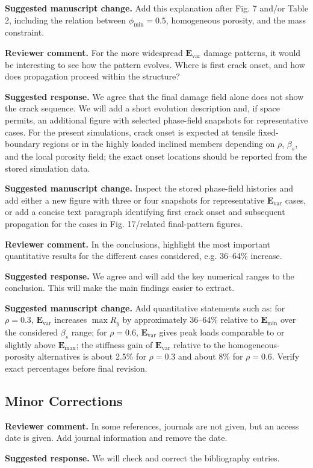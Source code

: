 \documentclass[11pt,a4paper]{article}
\newcommand{\Evar}{\ensuremath{\mathbf{E}_{\mathrm{var}}}}
\newcommand{\Emin}{\ensuremath{\mathbf{E}_{\mathrm{min}}}}
\newcommand{\Emax}{\ensuremath{\mathbf{E}_{\mathrm{max}}}}
\newcommand{\comment}[1]{\par\noindent\textbf{Reviewer comment.} #1\par}
\newcommand{\response}[1]{\par\noindent\textbf{Suggested response.} #1\par}
\newcommand{\change}[1]{\par\noindent\textbf{Suggested manuscript change.} #1\par}
\begin{document}
\change{Add this explanation after Fig. 7 and/or Table 2, including the
relation between \(\phi_\mathrm{min}=0.5\), homogeneous porosity, and the mass
constraint.}

\comment{For the more widespread \(\Evar\) damage patterns, it would be
interesting to see how the pattern evolves. Where is first crack onset, and how
does propagation proceed within the structure?}

\response{We agree that the final damage field alone does not show the crack
sequence. We will add a short evolution description and, if space permits, an
additional figure with selected phase-field snapshots for representative cases.
For the present simulations, crack onset is expected at tensile fixed-boundary
regions or in the highly loaded inclined members depending on \(\rho\),
\(\beta_s\), and the local porosity field; the exact onset locations should be
reported from the stored simulation data.}

\change{Inspect the stored phase-field histories and add either a new figure
with three or four snapshots for representative \(\Evar\) cases, or add a
concise text paragraph identifying first crack onset and subsequent propagation
for the cases in Fig. 17/related final-pattern figures.}

\comment{In the conclusions, highlight the most important quantitative results
for the different cases considered, e.g. 36--64\% increase.}

\response{We agree and will add the key numerical ranges to the conclusion.
This will make the main findings easier to extract.}

\change{Add quantitative statements such as: for \(\rho=0.3\), \(\Evar\)
increases \(\max R_y\) by approximately 36--64\% relative to \(\Emin\) over
the considered \(\beta_s\) range; for \(\rho=0.6\), \(\Evar\) gives peak loads
comparable to or slightly above \(\Emax\); the stiffness gain of \(\Evar\)
relative to the homogeneous-porosity alternatives is about 2.5\% for
\(\rho=0.3\) and about 8\% for \(\rho=0.6\). Verify exact percentages before
final revision.}

\subsection*{Minor Corrections}

\comment{In some references, journals are not given, but an access date is
given. Add journal information and remove the date.}

\response{We will check and correct the bibliography entries.}
\end{document}
